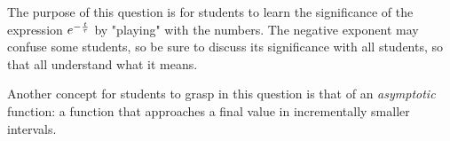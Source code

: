 





The purpose of this question is for students to learn the significance of the expression $e^{-{t \over \tau}}$ by "playing" with the numbers.  The negative exponent may confuse some students, so be sure to discuss its significance with all students, so that all understand what it means.

Another concept for students to grasp in this question is that of an {\it asymptotic} function: a function that approaches a final value in incrementally smaller intervals.




